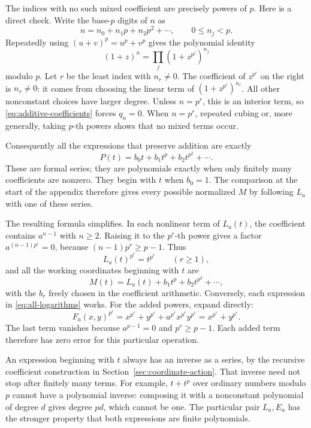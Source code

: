 \documentclass[11pt,letterpaper]{article}
\numberwithin{equation}{section}
\theoremstyle{definition}\newtheorem{example}[theorem]{Example}
\begin{document}
The indices with no such mixed coefficient are precisely powers of \(p\). Here is a direct check. Write the base-\(p\) digits of \(n\) as
\[
 n=n_0+n_1p+n_2p^2+\cdots,\qquad0\le n_j<p.
\]
Repeatedly using \((u+v)^p=u^p+v^p\) gives the polynomial identity
\[
 (1+z)^n=\prod_j(1+z^{p^j})^{n_j}
\]
modulo \(p\). Let \(r\) be the least index with \(n_r\ne0\). The coefficient of \(z^{p^r}\) on the right is \(n_r\ne0\): it comes from choosing the linear term of \((1+z^{p^r})^{n_r}\). All other nonconstant choices have larger degree. Unless \(n=p^r\), this is an interior term, so \eqref{eq:additive-coefficients} forces \(q_n=0\). When \(n=p^r\), repeated cubing or, more generally, taking \(p\)-th powers shows that no mixed terms occur.

Consequently all the expressions that preserve addition are exactly
\[
 P(t)=b_0t+b_1t^p+b_2t^{p^2}+\cdots.
\]
These are formal series; they are polynomials exactly when only finitely many coefficients are nonzero. They begin with \(t\) when \(b_0=1\). The comparison at the start of the appendix therefore gives every possible normalized \(M\) by following \(L_a\) with one of these series.

The resulting formula simplifies. In each nonlinear term of \(L_a(t)\), the coefficient contains \(a^{n-1}\) with \(n\ge2\). Raising it to the \(p^r\)-th power gives a factor \(a^{(n-1)p^r}=0\), because \((n-1)p^r\ge p-1\). Thus
\[
 L_a(t)^{p^r}=t^{p^r}\qquad(r\ge1),
\]
and all the working coordinates beginning with \(t\) are
\begin{equation}\label{eq:all-logarithms}
 \boxed{\;M(t)=L_a(t)+b_1t^p+b_2t^{p^2}+\cdots,\;}
\end{equation}
with the \(b_r\) freely chosen in the coefficient arithmetic. Conversely, each expression in \eqref{eq:all-logarithms} works. For the added powers, expand directly:
\[
 F_a(x,y)^{p^r}
 =x^{p^r}+y^{p^r}+a^{p^r}x^{p^r}y^{p^r}
 =x^{p^r}+y^{p^r}.
\]
The last term vanishes because \(a^{p-1}=0\) and \(p^r\ge p-1\). Each added term therefore has zero error for this particular operation.

An expression beginning with \(t\) always has an inverse as a series, by the recursive coefficient construction in Section~\ref{sec:coordinate-action}. That inverse need not stop after finitely many terms. For example, \(t+t^p\) over ordinary numbers modulo \(p\) cannot have a polynomial inverse: composing it with a nonconstant polynomial of degree \(d\) gives degree \(pd\), which cannot be one. The particular pair \(L_a,E_a\) has the stronger property that both expressions are finite polynomials.
\end{document}
